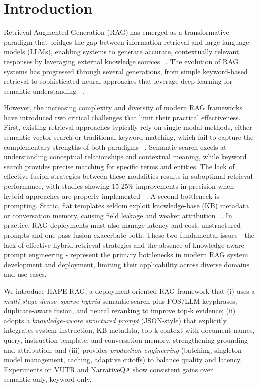 \documentclass[10pt,twocolumn,letterpaper]{article}
\begin{document}
\section{Introduction}

Retrieval-Augmented Generation (RAG) has emerged as a transformative paradigm that bridges the gap between information retrieval and large language models (LLMs), enabling systems to generate accurate, contextually relevant responses by leveraging external knowledge sources ~\cite{lewis2020retrieval}. The evolution of RAG systems has progressed through several generations, from simple keyword-based retrieval to sophisticated neural approaches that leverage deep learning for semantic understanding  ~\cite{vaswani2017attention,devlin2019bert}.

\vspace{0.5em}
However, the increasing complexity and diversity of modern RAG frameworks have introduced two critical challenges that limit their practical effectiveness. First, existing retrieval approaches typically rely on single-modal methods, either semantic vector search or traditional keyword matching, which fail to capture the complementary strengths of both paradigms  ~\cite{gao2021retrieval,mao2023neural}. Semantic search excels at understanding conceptual relationships and contextual meaning, while keyword search provides precise matching for specific terms and entities. The lack of effective fusion strategies between these modalities results in suboptimal retrieval performance, with studies showing 15-25\% improvements in precision when hybrid approaches are properly implemented ~\cite{zhang2024semantic,liu2024impact}. A second bottleneck is prompting. Static, flat templates seldom exploit knowledge‑base (KB) metadata or conversation memory, causing field leakage and weaker attribution ~\cite{wei2022chain,liu2023chained}. In practice, RAG deployments must also manage latency and cost; unstructured prompts and one‑pass fusion exacerbate both. These two fundamental issues - the lack of effective hybrid retrieval strategies and the absence of knowledge-aware prompt engineering - represent the primary bottlenecks in modern RAG system development and deployment, limiting their applicability across diverse domains and use cases.

\vspace{0.5em}
 We introduce HAPE-RAG, a deployment‑oriented RAG framework that (i) uses a \emph{multi‑stage dense–sparse hybrid}-semantic search plus POS/LLM keyphrases, duplicate‑aware fusion, and neural reranking to improve top‑k evidence; (ii) adopts a \emph{knowledge‑aware structured prompt} (JSON‑style) that explicitly integrates system instruction, KB metadata, top‑k context with document names, query, instruction template, and conversation memory, strengthening grounding and attribution; and (iii) provides \emph{production engineering} (batching, singleton model management, caching, adaptive cutoffs) to balance quality and latency. Experiments on VUTR and NarrativeQA show consistent gains over semantic‑only, keyword‑only.
\end{document}
